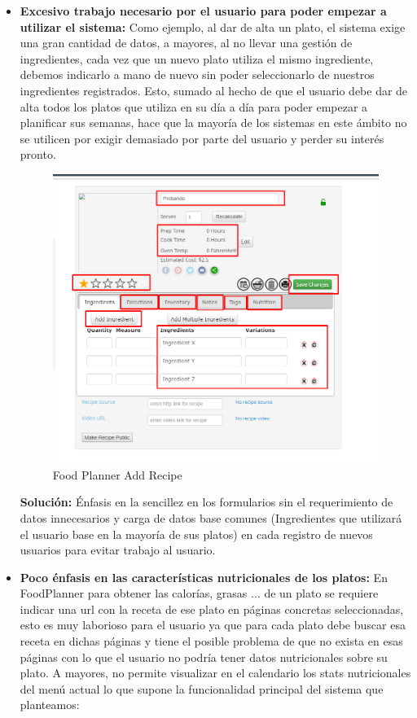 \documentclass[12pt, a4paper, twoside]{book}
\begin{document}
	\begin{itemize}
		\item \textbf{Excesivo trabajo necesario por el usuario para poder empezar a utilizar el sistema:} Como ejemplo, al dar de alta un plato, el sistema exige una gran cantidad de datos, a mayores, al no llevar una gestión de ingredientes, cada vez que un nuevo plato utiliza el mismo ingrediente, debemos indicarlo a mano de nuevo sin poder seleccionarlo de nuestros ingredientes registrados. Esto, sumado al hecho de que el usuario debe dar de alta todos los platos que utiliza en su día a día para poder empezar a planificar sus semanas, hace que la mayoría de los sistemas en este ámbito no se utilicen por exigir demasiado por parte del usuario y perder su interés pronto.
		\begin{center}
			\begin{figure}[H]
				\centering
				\includegraphics[width=15cm]{Imagenes/FoodPlannerAddRecipe.png}
				\caption{Food Planner Add Recipe}\label{Food Planner Add Recipe}
			\end{figure}
		\end{center}
		\textbf{Solución:} Énfasis en la sencillez en los formularios sin el requerimiento de datos innecesarios y carga de datos base comunes (Ingredientes que utilizará el usuario base en la mayoría de sus platos) en cada registro de nuevos usuarios para evitar trabajo al usuario.
		\item \textbf{Poco énfasis en las características nutricionales de los platos:} En FoodPlanner para obtener las calorías, grasas ... de un plato se requiere indicar una url con la receta de ese plato en páginas concretas seleccionadas, esto es muy laborioso para el usuario ya que para cada plato debe buscar esa receta en dichas páginas y tiene el posible problema de que no exista en esas páginas con lo que el usuario no podría tener datos nutricionales sobre su plato. A mayores, no permite visualizar en el calendario los stats nutricionales del menú actual lo que supone la funcionalidad principal del sistema que planteamos:

\end{itemize}
\end{document}
